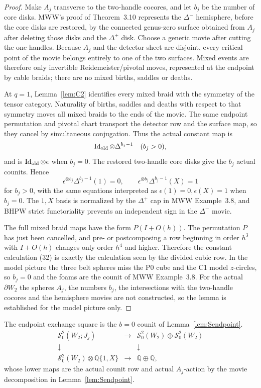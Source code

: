 \documentclass[11pt]{amsart}
\theoremstyle{definition}
\theoremstyle{remark}
\newcommand{\Q}{\mathbb{Q}}
\begin{document}
\begin{proof}
Make \(A_j\) transverse to the two-handle cocores, and let \(b_j\) be the
number of core disks.  MWW's proof of Theorem~3.10 represents the
\(\Delta^-\) hemisphere, before the core disks are restored, by the connected
genus-zero surface obtained from \(A_j\) after deleting those disks and the
\(\Delta^+\) disk.  Choose a generic movie after cutting the one-handles.
Because \(A_j\) and the detector sheet are disjoint, every critical point of
the movie belongs entirely to one of the two surfaces.  Mixed events are
therefore only invertible Reidemeister/pivotal moves, represented at the
endpoint by cable braids; there are no mixed births, saddles or deaths.

At \(q=1\), Lemma~\ref{lem:C2} identifies every mixed braid with the
symmetry of the tensor category.  Naturality of births, saddles and deaths
with respect to that symmetry moves all mixed braids to the ends of the
movie.  The same endpoint permutation and pivotal chart transport the
detector row and the surface map, so they cancel by simultaneous
conjugation.  Thus the actual constant map is
\[
\operatorname{Id}_{\rm old}\otimes\Delta^{b_j-1}\quad(b_j>0),
\]
and is \(\operatorname{Id}_{\rm old}\otimes\epsilon\) when \(b_j=0\).
The restored two-handle core disks give the \(b_j\) actual counits.  Hence
\[
\epsilon^{\otimes b_j}\Delta^{b_j-1}(1)=0,\qquad
\epsilon^{\otimes b_j}\Delta^{b_j-1}(X)=1
\tag{32}
\]
for \(b_j>0\), with the same equations interpreted as
\(\epsilon(1)=0,\epsilon(X)=1\) when \(b_j=0\).
The \(1,X\) basis is normalized by the \(\Delta^+\) cap in MWW
Example~3.8, and BHPW strict functoriality prevents an independent sign in
the \(\Delta^-\) movie.

The full mixed braid maps have the form \(P(I+O(h))\).  The permutation
\(P\) has just been cancelled, and pre- or postcomposing a row beginning in
order \(h^3\) with \(I+O(h)\) changes only order \(h^4\) and higher.
Therefore the constant calculation (32) is exactly the calculation seen by
the divided cubic row.  In the model picture the three belt spheres miss
the P0 cube and the C1 model $z$-circles, so $b_j=0$ and the foams are the
counit of MWW Example~3.8.  For the actual $\partial W_2$ the spheres
$A_j$, the numbers $b_j$, the intersections with the two-handle cocores and
the hemisphere movies are not constructed, so the lemma is established for
the model picture only.
\end{proof}

The endpoint exchange square is the $b=0$ counit of
Lemma~\ref{lem:Sendpoint}.
\[
\begin{array}{ccc}
\mathcal S^2_0(W_2;J_j)&\longrightarrow&
\mathcal S^2_0(W_2)\oplus\mathcal S^2_0(W_2)\\
\downarrow&&\downarrow\\
\mathcal S^2_0(W_2)\otimes\Q\{1,X\}&\longrightarrow&\Q\oplus\Q,
\end{array}
\]
whose lower maps are the actual counit row and actual \(A_j\)-action by the
movie decomposition in Lemma~\ref{lem:Sendpoint}.
\end{document}
